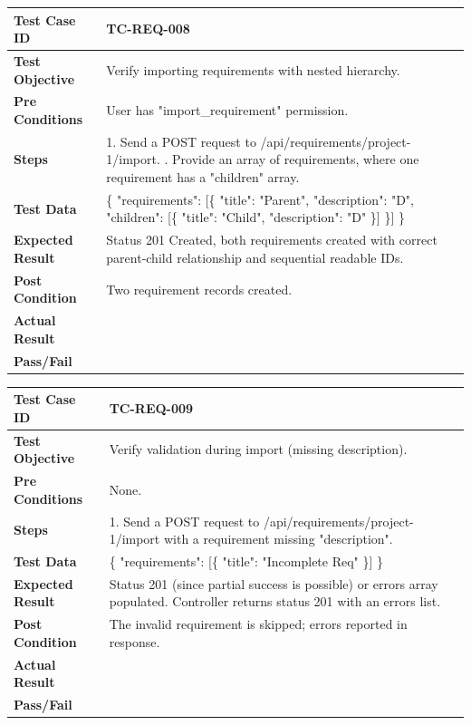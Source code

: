 \begin{longtable}{|p{}|p{}|}
\hline
\textbf{Test Case ID} & TC-REQ-008 \\ \hline
\textbf{Test Objective} & Verify importing requirements with nested hierarchy. \\ \hline
\textbf{Pre Conditions} & User has "import_requirement" permission. \\ \hline
\textbf{Steps} & 
1. Send a POST request to /api/requirements/project-1/import. \newline
2. Provide an array of requirements, where one requirement has a "children" array. \\ \hline
\textbf{Test Data} & \{ "requirements": [\{ "title": "Parent", "description": "D", "children": [\{ "title": "Child", "description": "D" \}] \}] \} \\ \hline
\textbf{Expected Result} & Status 201 Created, both requirements created with correct parent-child relationship and sequential readable IDs. \\ \hline
\textbf{Post Condition} & Two requirement records created. \\ \hline
\textbf{Actual Result} &  \\ \hline
\textbf{Pass/Fail} &  \\ \hline
\end{longtable}

\begin{longtable}{|p{}|p{}|}
\hline
\textbf{Test Case ID} & TC-REQ-009 \\ \hline
\textbf{Test Objective} & Verify validation during import (missing description). \\ \hline
\textbf{Pre Conditions} & None. \\ \hline
\textbf{Steps} & 
1. Send a POST request to /api/requirements/project-1/import with a requirement missing "description". \\ \hline
\textbf{Test Data} & \{ "requirements": [\{ "title": "Incomplete Req" \}] \} \\ \hline
\textbf{Expected Result} & Status 201 (since partial success is possible) or errors array populated. Controller returns status 201 with an errors list. \\ \hline
\textbf{Post Condition} & The invalid requirement is skipped; errors reported in response. \\ \hline
\textbf{Actual Result} &  \\ \hline
\textbf{Pass/Fail} &  \\ \hline
\end{longtable}

